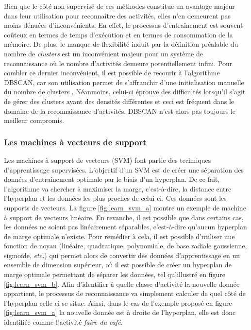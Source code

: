 Bien que le côté non-supervisé de ces méthodes constitue un avantage majeur dans leur utilisation pour reconnaître des activités, elles n'en demeurent pas moins dénuées d'inconvénients. En effet, le processus d'entraînement est souvent coûteux en termes de temps d'exécution et en termes de consommation de la mémoire. De plus, le manque de flexibilité induit par la définition préalable du nombre de \textit{clusters} est un inconvénient majeur pour un système de reconnaissance où le nombre d'activités demeure potentiellement infini. Pour combler ce dernier inconvénient, il est possible de recourir à l'algorithme \ac{DBSCAN}, car son utilisation permet de s'affranchir d'une initialisation manuelle du nombre de clusters \citep{Gan2015}. Néanmoins, celui-ci éprouve des difficultés lorsqu'il s'agit de gérer des clusters ayant des densités différentes et ceci est fréquent dans le domaine de la reconnaissance d'activités. \acs{DBSCAN} n'est alors pas toujours le meilleur compromis.

\subsubsection{Les machines à vecteurs de support}

Les machines à support de vecteurs (\ac{SVM}) \citep{Cortes1995} font partie des techniques d'apprentissage supervisées. L'objectif d'un \acs{SVM} est de créer une séparation des données d'entraînement optimale par le biais d'un hyperplan. De ce fait, l'algorithme va chercher à maximiser la marge, c'est-à-dire, la distance entre l'hyperplan et les données les plus proches de celui-ci. Ces données sont les supports de vecteurs. La figure \ref{fig:learn_svm_a} montre un exemple de machine à support de vecteurs linéaire. En revanche, il est possible que dans certains cas, les données ne soient pas linéairement séparables, c'est-à-dire qu'aucun hyperplan de marge optimale n'existe. Pour remédier à cela, il est possible d'utiliser une fonction de noyau (linéaire, quadratique, polynomiale, de base radiale gaussienne, sigmoïde, \textit{etc.}) qui permet alors de convertir des données d'apprentissage en un ensemble de dimension supérieur, où il est possible de créer un hyperplan de marge optimale permettant de séparer les données, tel qu'illustré en figure \ref{fig:learn_svm_b}. Afin d'identifier à quelle classe d'activité la nouvelle donnée appartient, le processus de reconnaissance va simplement calculer de quel côté de l'hyperplan celle-ci se situe. Ainsi, dans le cas de l'exemple proposé en figure \ref{fig:learn_svm_a} la nouvelle donnée est à droite de l'hyperplan, elle est donc identifiée comme l'activité \og \textit{faire du café}\fg.

